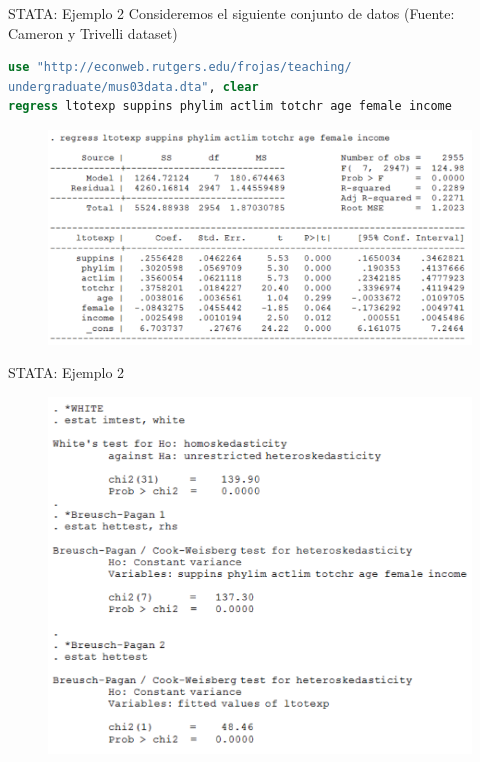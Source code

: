 \begin{frame}[fragile]{STATA: Ejemplo 2}
	Consideremos el siguiente conjunto de datos (Fuente: Cameron y Trivelli dataset)
{\small
\begin{lstlisting}[language=Stata, numbers=none]
use "http://econweb.rutgers.edu/frojas/teaching/
undergraduate/mus03data.dta", clear
regress ltotexp suppins phylim actlim totchr age female income
\end{lstlisting}
}
	\begin{figure}
		\centering
		\includegraphics[scale=.33]{fig/stata2a.png}
	\end{figure}
\end{frame}
\begin{frame}{STATA: Ejemplo 2}
	\begin{figure}
	\centering
	\includegraphics[scale=.37]{fig/stata2b.png}
	\end{figure}
\end{frame}
